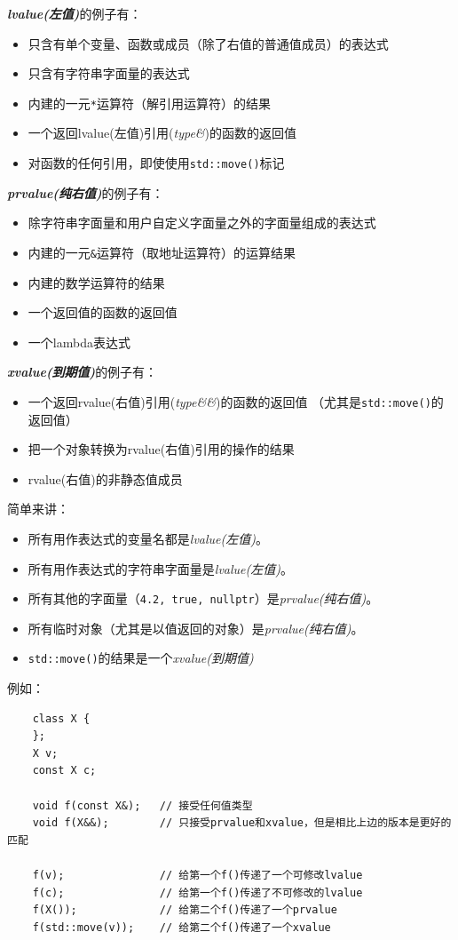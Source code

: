\emph{\textbf{lvalue(左值)}}的例子有：
\begin{itemize}
    \item 只含有单个变量、函数或成员（除了右值的普通值成员）的表达式
    \item 只含有字符串字面量的表达式
    \item 内建的一元\texttt{*}运算符（解引用运算符）的结果
    \item 一个返回lvalue(左值)引用(\emph{type\&})的函数的返回值
    \item 对函数的任何引用，即使使用\texttt{std::move()}标记
\end{itemize}
\emph{\textbf{prvalue(纯右值)}}的例子有：
\begin{itemize}
    \item 除字符串字面量和用户自定义字面量之外的字面量组成的表达式
    \item 内建的一元\texttt{\&}运算符（取地址运算符）的运算结果
    \item 内建的数学运算符的结果
    \item 一个返回值的函数的返回值
    \item 一个lambda表达式
\end{itemize}
\emph{\textbf{xvalue(到期值)}}的例子有：
\begin{itemize}
    \item 一个返回rvalue(右值)引用(\emph{type\&\&})的函数的返回值
    （尤其是\texttt{std::move()}的返回值）
    \item 把一个对象转换为rvalue(右值)引用的操作的结果
    \item rvalue(右值)的非静态值成员
\end{itemize}
简单来讲：
\begin{itemize}
    \item 所有用作表达式的变量名都是\emph{lvalue(左值)}。
    \item 所有用作表达式的字符串字面量是\emph{lvalue(左值)}。
    \item 所有其他的字面量（\texttt{4.2, true, nullptr}）是\emph{prvalue(纯右值)}。
    \item 所有临时对象（尤其是以值返回的对象）是\emph{prvalue(纯右值)}。
    \item \texttt{std::move()}的结果是一个\emph{xvalue(到期值)}
\end{itemize}
例如：
\begin{lstlisting}
    class X {
    };
    X v;
    const X c;

    void f(const X&);   // 接受任何值类型
    void f(X&&);        // 只接受prvalue和xvalue，但是相比上边的版本是更好的匹配

    f(v);               // 给第一个f()传递了一个可修改lvalue
    f(c);               // 给第一个f()传递了不可修改的lvalue
    f(X());             // 给第二个f()传递了一个prvalue
    f(std::move(v));    // 给第二个f()传递了一个xvalue
\end{lstlisting}
